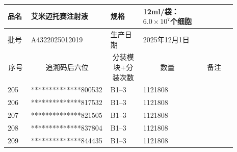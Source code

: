 \documentclass[UTF8,10pt,a4paper,fontset=fandol]{ctexart}
\newcommand{\fieldvalue}[1]{#1}
\begin{document}
\begin{center}
\small
\begin{tabular}{|p{0.10\linewidth}|p{0.25\linewidth}|p{0.14\linewidth}|p{0.24\linewidth}|p{0.16\linewidth}|}
\hline
品名 &
\fieldvalue{艾米迈托赛注射液} &
规格 &
\fieldvalue{12ml/袋：$6.0\times10^{7}$个细胞} \\
\hline
批号 &
\fieldvalue{A4322025012019} &
生产日期 &
\fieldvalue{2025年12月1日} \\
\hline
\multicolumn{1}{|c|}{序号} &
\multicolumn{1}{c|}{追溯码后六位} &
\multicolumn{1}{c|}{分装模块+分装次数} &
\multicolumn{1}{c|}{数量} &
\multicolumn{1}{c|}{备注} \\
\hline

\fieldvalue{205} &
\fieldvalue{**************800532} &
\fieldvalue{B1--3} &
\fieldvalue{1121808} & \\ \hline

\fieldvalue{206} &
\fieldvalue{**************817532} &
\fieldvalue{B1--3} &
\fieldvalue{1121808} & \\ \hline

\fieldvalue{207} &
\fieldvalue{**************821505} &
\fieldvalue{B1--3} &
\fieldvalue{1121808} & \\ \hline

\fieldvalue{208} &
\fieldvalue{**************837804} &
\fieldvalue{B1--3} &
\fieldvalue{1121808} & \\ \hline

\fieldvalue{209} &
\fieldvalue{**************844435} &
\fieldvalue{B1--3} &
\fieldvalue{1121808} & \\ \hline


\end{tabular}
\end{center}
\end{document}
